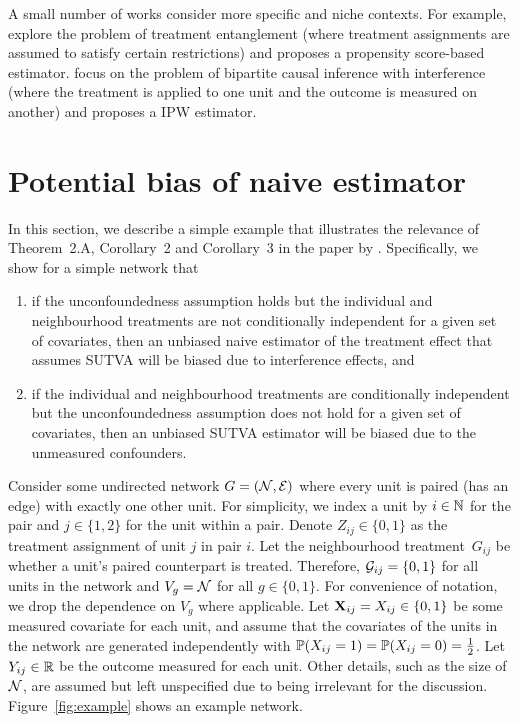 \documentclass[10pt]{article}
\begin{document}
A small number of works consider more specific and niche contexts. For example, \textcite{Toulis:2018} explore the problem of treatment entanglement (where treatment assignments are assumed to satisfy certain restrictions) and proposes a propensity score-based estimator. \textcite{Zigler:2021} focus on the problem of bipartite causal inference with interference (where the treatment is applied to one unit and the outcome is measured on another) and proposes a IPW estimator.


\section{Potential bias of naive estimator}\label{sec:example}

In this section, we describe a simple example that illustrates the relevance of Theorem~2.A, Corollary~2 and Corollary~3 in the paper by \textcite{Forastiere:2021}. Specifically, we show for a simple network that
\begin{enumerate}

\item
if the unconfoundedness assumption holds but the individual and neighbourhood treatments are not conditionally independent for a given set of covariates, then an unbiased naive estimator of the treatment effect that assumes SUTVA will be biased due to interference effects, and

\item
if the individual and neighbourhood treatments are conditionally independent but the unconfoundedness assumption does not hold for a given set of covariates, then an unbiased SUTVA estimator will be biased due to the unmeasured confounders.

\end{enumerate}

Consider some undirected network $G=(\calN,\calE)$ where every unit is paired (has an edge) with exactly one other unit. For simplicity, we index a unit by $i\in\bbN$ for the pair and $j\in\{1,2\}$ for the unit within a pair. Denote $Z_{ij}\in\{0,1\}$ as the treatment assignment of unit $j$ in pair $i$. Let the neighbourhood treatment~$G_{ij}$ be whether a unit's paired counterpart is treated. Therefore, $\calG_{ij}=\{0,1\}$ for all units in the network and $V_g=\calN$ for all $g\in\{0,1\}$. For convenience of notation, we drop the dependence on $V_g$ where applicable. Let $\bfX_{ij}=X_{ij}\in\{0,1\}$ be some measured covariate for each unit, and assume that the covariates of the units in the network are generated independently with $\P(X_{ij}=1)=\P(X_{ij}=0)=\frac{1}{2}$. Let $Y_{ij}\in\bbR$ be the outcome measured for each unit. Other details, such as the size of $\calN$, are assumed but left unspecified due to being irrelevant for the discussion. Figure~\ref{fig:example} shows an example network.
\\
\end{document}
